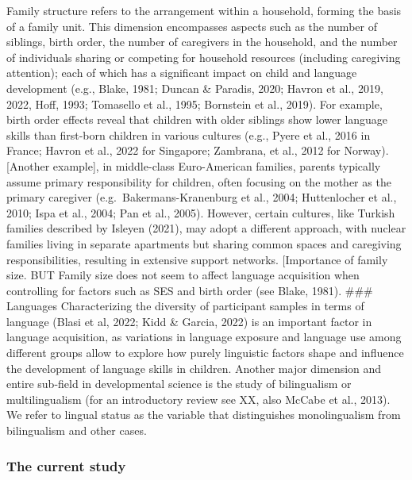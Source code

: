 \documentclass[
  man,floatsintext]{apa6}
\begin{document}
Family structure refers to the arrangement within a household, forming the basis of a family unit. This dimension encompasses aspects such as the number of siblings, birth order, the number of caregivers in the household, and the number of individuals sharing or competing for household resources (including caregiving attention); each of which has a significant impact on child and language development (e.g., Blake, 1981; Duncan \& Paradis, 2020; Havron et al., 2019, 2022, Hoff, 1993; Tomasello et al., 1995; Bornstein et al., 2019). For example, birth order effects reveal that children with older siblings show lower language skills than first-born children in various cultures (e.g., Pyere et al., 2016 in France; Havron et al., 2022 for Singapore; Zambrana, et al., 2012 for Norway).
{[}Another example{]}, in middle-class Euro-American families, parents typically assume primary responsibility for children, often focusing on the mother as the primary caregiver (e.g.~Bakermans-Kranenburg et al., 2004; Huttenlocher et al., 2010; Ispa et al., 2004; Pan et al., 2005). However, certain cultures, like Turkish families described by Isleyen (2021), may adopt a different approach, with nuclear families living in separate apartments but sharing common spaces and caregiving responsibilities, resulting in extensive support networks. {[}Importance of family size. BUT Family size does not seem to affect language acquisition when controlling for factors such as SES and birth order (see Blake, 1981).
\#\#\# Languages
Characterizing the diversity of participant samples in terms of language (Blasi et al, 2022; Kidd \& Garcia, 2022) is an important factor in language acquisition, as variations in language exposure and language use among different groups allow to explore how purely linguistic factors shape and influence the development of language skills in children. Another major dimension and entire sub-field in developmental science is the study of bilingualism or multilingualism (for an introductory review see XX, also McCabe et al., 2013). We refer to lingual status as the variable that distinguishes monolingualism from bilingualism and other cases.

\subsubsection{The current study}\label{the-current-study}
\end{document}

